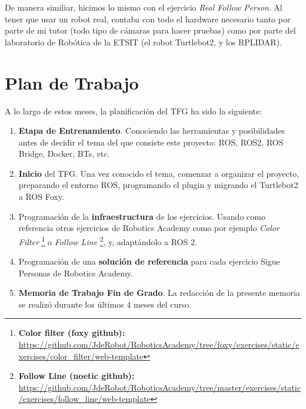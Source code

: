 De manera similiar, hicimos lo mismo con el ejercicio \textit{Real Follow Person}. Al tener que usar un robot real, contaba con todo el hardware necesario tanto por parte de mi tutor (todo tipo de cámaras para hacer pruebas) como por parte del laboratorio de Robótica de la ETSIT (el robot Turtlebot2, y los RPLIDAR).


\section{Plan de Trabajo}
\label{sec:plan_trabajo}
A lo largo de estos meses, la planificación del TFG ha sido la siguiente:

\begin{enumerate}
	\item \textbf{Etapa de Entrenamiento}. Conociendo las herramientas y posibilidades antes de decidir el tema del que consiste este proyecto: ROS, ROS2, ROS Bridge, Docker, BTs, etc.
	\item \textbf{Inicio} del TFG. Una vez conocido el tema, comenzar a organizar el proyecto, preparando el entorno ROS, programando el plugin y migrando el Turtlebot2 a ROS Foxy.
	\item Programación de la \textbf{infraestructura} de los ejercicios. Usando como referencia otros ejercicios de Robotics Academy como por ejemplo \textit{Color Filter} \footnote{\textbf{Color filter (foxy github):} \url{https://github.com/JdeRobot/RoboticsAcademy/tree/foxy/exercises/static/exercises/color_filter/web-template}} o \textit{Follow Line} \footnote{\textbf{Follow Line (noetic github):} \url{https://github.com/JdeRobot/RoboticsAcademy/tree/master/exercises/static/exercises/follow_line/web-template}}, y, adaptándolo a ROS 2.
	\item Programación de una \textbf{solución de referencia} para cada ejercicio Sigue Personas de Robotics Academy.
	\item \textbf{Memoria de Trabajo Fin de Grado}. La redacción de la presente memoria se realizó durante los últimos 4 meses del curso. 
\end{enumerate}


